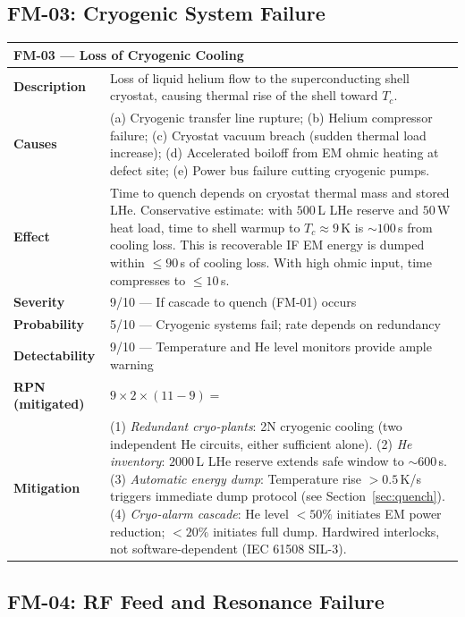 \documentclass[11pt,a4paper]{article}
\newcommand{\Slow}[1]{\cellcolor{risk-low!20}{#1}}
\begin{document}
\subsection{FM-03: Cryogenic System Failure}

\begin{longtable}{p{0.25\tw}p{0.65\tw}}
\toprule
\multicolumn{2}{l}{\textbf{FM-03 --- Loss of Cryogenic Cooling}} \\
\midrule
\endhead
\textbf{Description} &
  Loss of liquid helium flow to the superconducting shell cryostat,
  causing thermal rise of the shell toward $T_c$. \\[4pt]
\textbf{Causes} &
  (a) Cryogenic transfer line rupture; (b) Helium compressor failure;
  (c) Cryostat vacuum breach (sudden thermal load increase);
  (d) Accelerated boiloff from EM ohmic heating at defect site;
  (e) Power bus failure cutting cryogenic pumps. \\[4pt]
\textbf{Effect} &
  Time to quench depends on cryostat thermal mass and stored LHe.
  Conservative estimate: with $500$\,L LHe reserve and $50$\,W heat load,
  time to shell warmup to $T_c \approx 9$\,K is $\sim 100$\,s from
  cooling loss. This is recoverable IF EM energy is dumped within
  $\leq 90$\,s of cooling loss. With high ohmic input, time compresses
  to $\leq 10$\,s. \\[4pt]
\textbf{Severity} & 9/10 --- If cascade to quench (FM-01) occurs \\[4pt]
\textbf{Probability} & 5/10 --- Cryogenic systems fail; rate depends
  on redundancy \\[4pt]
\textbf{Detectability} & 9/10 --- Temperature and He level monitors
  provide ample warning \\[4pt]
\textbf{RPN (mitigated)} & $9 \times 2 \times (11-9) = $ \Slow{36} \\[4pt]
\textbf{Mitigation} &
  (1) \textit{Redundant cryo-plants}: 2N cryogenic cooling (two
  independent He circuits, either sufficient alone). (2) \textit{He
  inventory}: $2000$\,L LHe reserve extends safe window to $\sim 600$\,s.
  (3) \textit{Automatic energy dump}: Temperature rise $> 0.5$\,K/s
  triggers immediate dump protocol (see Section~\ref{sec:quench}).
  (4) \textit{Cryo-alarm cascade}: He level $< 50\%$ initiates EM power
  reduction; $< 20\%$ initiates full dump. Hardwired interlocks, not
  software-dependent (IEC 61508 SIL-3). \\
\bottomrule
\end{longtable}

\subsection{FM-04: RF Feed and Resonance Failure}
\end{document}
